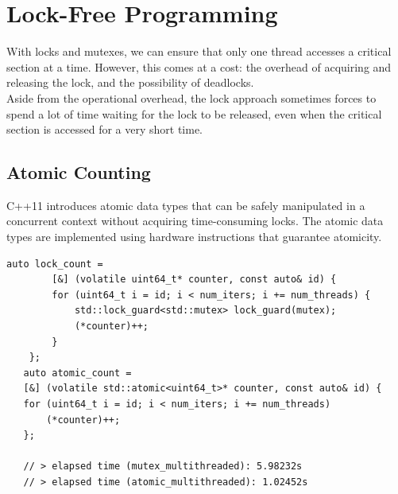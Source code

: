 \section{Lock-Free Programming}
With locks and mutexes, we can ensure that only one thread accesses a critical section at a time. However, this comes at a cost: the overhead of acquiring and releasing the lock, and the possibility of deadlocks.\\
Aside from the operational overhead, the lock approach sometimes forces to spend a lot of time waiting for the lock to be released, even when the critical section is accessed for a very short time.

\subsection{Atomic Counting}
C++11 introduces atomic data types that can be safely manipulated in a concurrent context without acquiring time-consuming locks.
The atomic data types are implemented using hardware instructions that guarantee atomicity.

\begin{lstlisting}[caption={spmcode4/atomic\_counting.cpp}]
   auto lock_count =
        [&] (volatile uint64_t* counter, const auto& id) {
        for (uint64_t i = id; i < num_iters; i += num_threads) {
            std::lock_guard<std::mutex> lock_guard(mutex);
            (*counter)++;
        }
    };
   auto atomic_count =
   [&] (volatile std::atomic<uint64_t>* counter, const auto& id) {
   for (uint64_t i = id; i < num_iters; i += num_threads)
       (*counter)++;
   };

   // > elapsed time (mutex_multithreaded): 5.98232s
   // > elapsed time (atomic_multithreaded): 1.02452s
\end{lstlisting}

